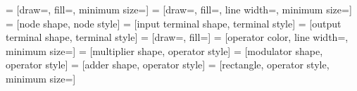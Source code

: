 %


%
%
%
   = [draw=\pathdrawcolor,
      fill=\pathdrawcolor,
      minimum size=\nodesize]
%
   = [draw=\pathdrawcolor,
      fill=\pathfillcolor,
      line width=\pathlinewidth,
      minimum size=\terminalsize]
%
   = [node shape,
      node style]
%
   = [input terminal shape,
      terminal style]
%
   = [output terminal shape,
      terminal style]
%
   = [draw=\operatordrawcolor,
      fill=\operatorfillcolor]
%
   = [operator color,
      line width=\operatorlinewidth,
      minimum size=\operatorsize]
%
   = [multiplier shape,
      operator style]
%
   = [modulator shape,
      operator style]
%
   = [adder shape,
      operator style]
%
   = [rectangle,
      operator style,
      minimum size=\delaysize]


%
%
\newcommand{\circularshape}[1]{%
  \savedanchor\centerpoint{\pgfpointorigin}
  \saveddimen\radius{%
    \setlength{\pgf@xa}{\pgfshapeminwidth}
    \setlength{\pgf@ya}{\pgfshapeminheight}
    \ifdim\pgf@xa>\pgf@ya
      \pgf@x=.5\pgf@xa
    \else
      \pgf@x=.5\pgf@ya
    \fi
  }
  \inheritanchor[from=circle]{center}
  \inheritanchorborder[from=circle]
  \inheritanchor[from=circle]{north}
  \inheritanchor[from=circle]{north east}
  \inheritanchor[from=circle]{east}
  \inheritanchor[from=circle]{south east}
  \inheritanchor[from=circle]{south}
  \inheritanchor[from=circle]{south west}
  \inheritanchor[from=circle]{west}
  \inheritanchor[from=circle]{north west}
  \inheritanchor[from=circle]{mid}
  \inheritanchor[from=circle]{mid west}
  \inheritanchor[from=circle]{mid east}
  \inheritanchor[from=circle]{base}
  \inheritanchor[from=circle]{base west}
  \inheritanchor[from=circle]{base east}
  \inheritbackgroundpath[from=circle]
  \foregroundpath{
    \centerpoint%
    \pgf@xc=\pgf@x%
    \pgf@yc=\pgf@y%
    \@tempdima=\radius%
    #1
  }
  \nodeparts{}
}


